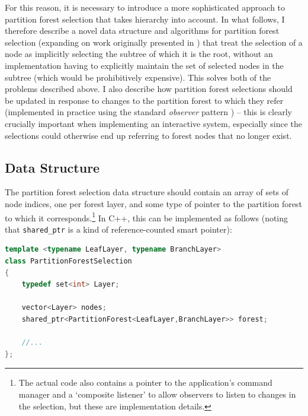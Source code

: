 For this reason, it is necessary to introduce a more sophisticated approach to partition forest selection that takes hierarchy into account. In what follows, I therefore describe a novel data structure and algorithms for partition forest selection (expanding on work originally presented in \cite{gvcispa09}) that treat the selection of a node as implicitly selecting the subtree of which it is the root, without an implementation having to explicitly maintain the set of selected nodes in the subtree (which would be prohibitively expensive). This solves both of the problems described above. I also describe how partition forest selections should be updated in response to changes to the partition forest to which they refer (implemented in practice using the standard \emph{observer} pattern \cite{gamma95}) -- this is clearly crucially important when implementing an interactive system, especially since the selections could otherwise end up referring to forest nodes that no longer exist.

\subsection{Data Structure}

The partition forest selection data structure should contain an array of sets of node indices, one per forest layer, and some type of pointer to the partition forest to which it corresponds.\footnote{The actual code also contains a pointer to the application's command manager and a `composite listener' to allow observers to listen to changes in the selection, but these are implementation details.} In C++, this can be implemented as follows (noting that \texttt{shared_ptr} is a kind of reference-counted smart pointer):

\begin{lstlisting}[style=Default,language=C++]
template <typename LeafLayer, typename BranchLayer>
class PartitionForestSelection
{
	typedef set<int> Layer;

	vector<Layer> nodes;
	shared_ptr<PartitionForest<LeafLayer,BranchLayer>> forest;

	//...
};
\end{lstlisting}

